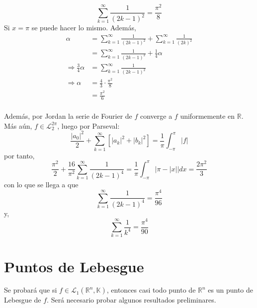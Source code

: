 \documentclass[12pt]{report}
\theoremstyle{largebreak}
\newcommand\abs[1]{\ensuremath{\left|#1\right|}}
\begin{document}
\begin{exa}
\begin{equation*}
            \sum_{ k=1}^\infty\frac{1}{(2k-1)^2}=\frac{\pi^2}{8}
        \end{equation*}
        Si $x=\pi$ se puede hacer lo mismo. Además,
        \begin{equation*}
            \begin{split}
                \alpha&=\sum_{ k=1}^\infty\frac{1}{(2k-1)^2}+\sum_{ k=1}^\infty\frac{1}{(2k)^2}\\
                &=\sum_{ k=1}^\infty\frac{1}{(2k-1)^2}+\frac{1}{4}\alpha\\
                \Rightarrow \frac{3}{4}\alpha&=\sum_{ k=1}^\infty\frac{1}{(2k-1)^2}\\
                \Rightarrow \alpha&=\frac{4}{3}\cdot\frac{\pi^2}{8}\\
                &=\frac{\pi^2}{6}\\
            \end{split}
        \end{equation*}

        Además, por Jordan la serie de Fourier de $f$ converge a $f$ uniformemente en $\mathbb{R}$. Más aún, $f\in\mathcal{L}_2^{2\pi}$, luego por Parseval:
        \begin{equation*}
            \frac{\abs{a_0}^2}{2}+\sum_{ k=1}^\infty\left[\abs{a_k}^2+\abs{b_k}^2 \right]=\frac{1}{\pi}\int_{-\pi}^{\pi}\abs{f}
        \end{equation*}
        por tanto,
        \begin{equation*}
            \frac{\pi^2}{2}+\frac{16}{\pi^2}\sum_{ k=1}^\infty\frac{1}{(2k-1)^4}=\frac{1}{\pi}\int_{-\pi}^{\pi}\abs{\pi-\abs{x}}dx=\frac{2\pi^2}{3}
        \end{equation*}
        con lo que se llega a que
        \begin{equation*}
            \sum_{ k=1}^\infty\frac{1}{(2k-1)^4}=\frac{\pi^4}{96}
        \end{equation*}
        y,
        \begin{equation*}
            \sum_{ k=1}^\infty\frac{1}{k^4}=\frac{\pi^4}{90}
        \end{equation*}
    \end{exa}

    \section{Puntos de Lebesgue}    

    Se probará que si $f\in\mathcal{L}_1(\mathbb{R}^n,\mathbb{K})$, entonces casi todo punto de $\mathbb{R}^n$ es un punto de Lebesgue de $f$. Será necesario probar algunos resultados preliminares.
\end{document}
